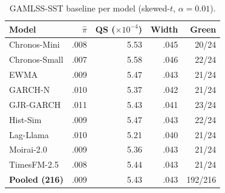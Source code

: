 
\begin{table}[htbp]
  \centering
  \caption{GAMLSS-SST baseline per model (skewed-$t$, $\alpha = 0.01$).}
  \label{tab:gamlss}
  \footnotesize
  \begin{tabular}{@{}lrrrr@{}}
    \toprule
    Model & $\hat\pi$ & QS ($\times 10^{-4}$) & Width & Green \\
    \midrule
    Chronos-Mini     & .008 & 5.53 & .045 & 20/24 \\
    Chronos-Small    & .007 & 5.58 & .046 & 22/24 \\
    EWMA             & .009 & 5.47 & .043 & 21/24 \\
    GARCH-N          & .010 & 5.37 & .042 & 21/24 \\
    GJR-GARCH        & .011 & 5.43 & .041 & 23/24 \\
    Hist-Sim         & .009 & 5.47 & .043 & 22/24 \\
    Lag-Llama        & .010 & 5.21 & .040 & 21/24 \\
    Moirai-2.0       & .009 & 5.36 & .043 & 21/24 \\
    TimesFM-2.5      & .008 & 5.44 & .043 & 21/24 \\
    \midrule
    \textbf{Pooled (216)} & .009 & 5.43 & .043 & 192/216 \\
    \bottomrule
  \end{tabular}
\end{table}
